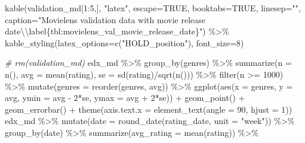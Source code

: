 \documentclass[
]{article}
\newenvironment{Shaded}{}{}
\newcommand{\AttributeTok}[1]{\textcolor[rgb]{0.49,0.56,0.16}{#1}}
\newcommand{\CommentTok}[1]{\textcolor[rgb]{0.38,0.63,0.69}{\textit{#1}}}
\newcommand{\ConstantTok}[1]{\textcolor[rgb]{0.53,0.00,0.00}{#1}}
\newcommand{\DecValTok}[1]{\textcolor[rgb]{0.25,0.63,0.44}{#1}}
\newcommand{\FunctionTok}[1]{\textcolor[rgb]{0.02,0.16,0.49}{#1}}
\newcommand{\NormalTok}[1]{#1}
\newcommand{\SpecialCharTok}[1]{\textcolor[rgb]{0.25,0.44,0.63}{#1}}
\newcommand{\StringTok}[1]{\textcolor[rgb]{0.25,0.44,0.63}{#1}}
\begin{document}
\begin{Shaded}
\begin{Highlighting}[]
\FunctionTok{kable}\NormalTok{(validation\_md[}\DecValTok{1}\SpecialCharTok{:}\DecValTok{5}\NormalTok{,], }\StringTok{"latex"}\NormalTok{, }\AttributeTok{escape=}\ConstantTok{TRUE}\NormalTok{, }\AttributeTok{booktabs=}\ConstantTok{TRUE}\NormalTok{, }\AttributeTok{linesep=}\StringTok{""}\NormalTok{, }\AttributeTok{caption=}\StringTok{"Movielens validation data with movie release date}\SpecialCharTok{\textbackslash{}\textbackslash{}}\StringTok{label\{tbl:movielens\_val\_movie\_release\_date\}"}\NormalTok{) }\SpecialCharTok{\%\textgreater{}\%}
    \FunctionTok{kable\_styling}\NormalTok{(}\AttributeTok{latex\_options=}\FunctionTok{c}\NormalTok{(}\StringTok{"HOLD\_position"}\NormalTok{), }\AttributeTok{font\_size=}\DecValTok{8}\NormalTok{)}

\CommentTok{\# rm(validation\_md)}
\NormalTok{edx\_md }\SpecialCharTok{\%\textgreater{}\%} \FunctionTok{group\_by}\NormalTok{(genres) }\SpecialCharTok{\%\textgreater{}\%}
  \FunctionTok{summarize}\NormalTok{(}\AttributeTok{n =} \FunctionTok{n}\NormalTok{(), }\AttributeTok{avg =} \FunctionTok{mean}\NormalTok{(rating), }\AttributeTok{se =} \FunctionTok{sd}\NormalTok{(rating)}\SpecialCharTok{/}\FunctionTok{sqrt}\NormalTok{(}\FunctionTok{n}\NormalTok{())) }\SpecialCharTok{\%\textgreater{}\%}
  \FunctionTok{filter}\NormalTok{(n }\SpecialCharTok{\textgreater{}=} \DecValTok{1000}\NormalTok{) }\SpecialCharTok{\%\textgreater{}\%} 
  \FunctionTok{mutate}\NormalTok{(}\AttributeTok{genres =} \FunctionTok{reorder}\NormalTok{(genres, avg)) }\SpecialCharTok{\%\textgreater{}\%}
  \FunctionTok{ggplot}\NormalTok{(}\FunctionTok{aes}\NormalTok{(}\AttributeTok{x =}\NormalTok{ genres, }\AttributeTok{y =}\NormalTok{ avg, }\AttributeTok{ymin =}\NormalTok{ avg }\SpecialCharTok{{-}} \DecValTok{2}\SpecialCharTok{*}\NormalTok{se, }\AttributeTok{ymax =}\NormalTok{ avg }\SpecialCharTok{+} \DecValTok{2}\SpecialCharTok{*}\NormalTok{se)) }\SpecialCharTok{+} 
  \FunctionTok{geom\_point}\NormalTok{() }\SpecialCharTok{+}
  \FunctionTok{geom\_errorbar}\NormalTok{() }\SpecialCharTok{+} 
  \FunctionTok{theme}\NormalTok{(}\AttributeTok{axis.text.x =} \FunctionTok{element\_text}\NormalTok{(}\AttributeTok{angle =} \DecValTok{90}\NormalTok{, }\AttributeTok{hjust =} \DecValTok{1}\NormalTok{))}
\NormalTok{edx\_md }\SpecialCharTok{\%\textgreater{}\%} \FunctionTok{mutate}\NormalTok{(}\AttributeTok{date =} \FunctionTok{round\_date}\NormalTok{(rating\_date, }\AttributeTok{unit =} \StringTok{"week"}\NormalTok{)) }\SpecialCharTok{\%\textgreater{}\%}
  \FunctionTok{group\_by}\NormalTok{(date) }\SpecialCharTok{\%\textgreater{}\%}
  \FunctionTok{summarize}\NormalTok{(}\AttributeTok{avg\_rating =} \FunctionTok{mean}\NormalTok{(rating)) }\SpecialCharTok{\%\textgreater{}\%}

\end{Highlighting}
\end{Shaded}
\end{document}
